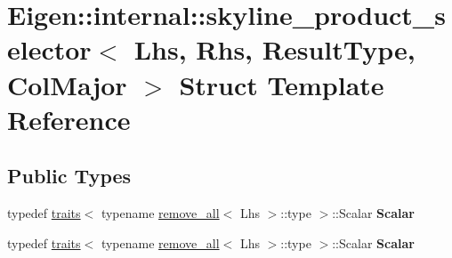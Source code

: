 \hypertarget{struct_eigen_1_1internal_1_1skyline__product__selector_3_01_lhs_00_01_rhs_00_01_result_type_00_01_col_major_01_4}{}\section{Eigen\+:\+:internal\+:\+:skyline\+\_\+product\+\_\+selector$<$ Lhs, Rhs, Result\+Type, Col\+Major $>$ Struct Template Reference}
\label{struct_eigen_1_1internal_1_1skyline__product__selector_3_01_lhs_00_01_rhs_00_01_result_type_00_01_col_major_01_4}
\subsection*{Public Types}
\begin{DoxyCompactItemize}
\item 
\mbox{\label{struct_eigen_1_1internal_1_1skyline__product__selector_3_01_lhs_00_01_rhs_00_01_result_type_00_01_col_major_01_4_a0e7cb402495b9333251ab9bf62651d64}} 
typedef \hyperlink{struct_eigen_1_1internal_1_1traits}{traits}$<$ typename \hyperlink{struct_eigen_1_1internal_1_1remove__all}{remove\+\_\+all}$<$ Lhs $>$\+::type $>$\+::Scalar {\bfseries Scalar}
\item 
\mbox{\label{struct_eigen_1_1internal_1_1skyline__product__selector_3_01_lhs_00_01_rhs_00_01_result_type_00_01_col_major_01_4_a0e7cb402495b9333251ab9bf62651d64}} 
typedef \hyperlink{struct_eigen_1_1internal_1_1traits}{traits}$<$ typename \hyperlink{struct_eigen_1_1internal_1_1remove__all}{remove\+\_\+all}$<$ Lhs $>$\+::type $>$\+::Scalar {\bfseries Scalar}
\end{DoxyCompactItemize}
